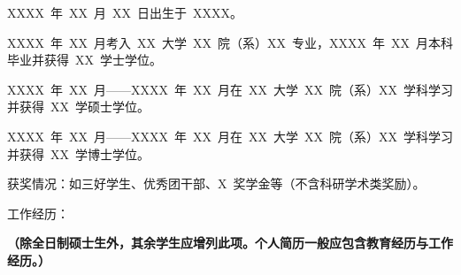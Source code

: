 
\begin{resume}
XXXX~年~XX~月~XX~日出生于~XXXX。

XXXX~年~XX~月考入~XX~大学~XX~院（系）XX~专业，XXXX~年~XX~月本科毕业并获得~XX~学士学位。

XXXX~年~XX~月------XXXX~年~XX~月在~XX~大学~XX~院（系）XX~学科学习并获得~XX~学硕士学位。

XXXX~年~XX~月------XXXX~年~XX~月在~XX~大学~XX~院（系）XX~学科学习并获得~XX~学博士学位。

获奖情况：如三好学生、优秀团干部、X~奖学金等（不含科研学术类奖励）。

工作经历：

\textbf{（除全日制硕士生外，其余学生应增列此项。个人简历一般应包含教育经历与工作经历。）}
\end{resume}
